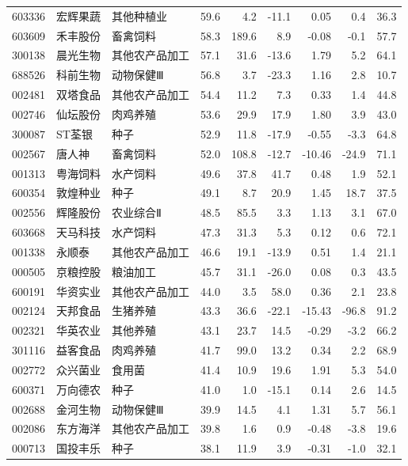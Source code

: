 \begin{longtable}{@{}llp{1.9cm}rrrrrr@{}}
603336 & 宏辉果蔬 & 其他种植业 & 59.6 & 4.2 & -11.1 & 0.05 & 0.4 & 36.3 \\
603609 & 禾丰股份 & 畜禽饲料 & 58.3 & 189.6 & 8.9 & -0.08 & -0.1 & 57.7 \\
300138 & 晨光生物 & 其他农产品加工 & 57.1 & 31.6 & -13.6 & 1.79 & 5.2 & 64.1 \\
688526 & 科前生物 & 动物保健Ⅲ & 56.8 & 3.7 & -23.3 & 1.16 & 2.8 & 10.7 \\
002481 & 双塔食品 & 其他农产品加工 & 54.4 & 11.2 & 7.3 & 0.33 & 1.4 & 44.8 \\
002746 & 仙坛股份 & 肉鸡养殖 & 53.6 & 29.9 & 17.9 & 1.80 & 3.9 & 43.0 \\
300087 & ST荃银 & 种子 & 52.9 & 11.8 & -17.9 & -0.55 & -3.3 & 64.8 \\
002567 & 唐人神 & 畜禽饲料 & 52.0 & 108.8 & -12.7 & -10.46 & -24.9 & 71.1 \\
001313 & 粤海饲料 & 水产饲料 & 49.6 & 37.8 & 41.7 & 0.48 & 1.9 & 52.1 \\
600354 & 敦煌种业 & 种子 & 49.1 & 8.7 & 20.9 & 1.45 & 18.7 & 37.5 \\
002556 & 辉隆股份 & 农业综合Ⅱ & 48.5 & 85.5 & 3.3 & 1.13 & 3.1 & 67.0 \\
603668 & 天马科技 & 水产饲料 & 47.3 & 31.3 & 5.3 & 0.12 & 0.6 & 72.1 \\
001338 & 永顺泰 & 其他农产品加工 & 46.6 & 19.1 & -13.9 & 0.51 & 1.4 & 21.1 \\
000505 & 京粮控股 & 粮油加工 & 45.7 & 31.1 & -26.0 & 0.08 & 0.3 & 43.5 \\
600191 & 华资实业 & 其他农产品加工 & 44.0 & 3.5 & 58.0 & 0.36 & 2.1 & 23.8 \\
002124 & 天邦食品 & 生猪养殖 & 43.3 & 36.6 & -22.1 & -15.43 & -96.8 & 91.2 \\
002321 & 华英农业 & 其他养殖 & 43.1 & 23.7 & 14.5 & -0.29 & -3.2 & 66.2 \\
301116 & 益客食品 & 肉鸡养殖 & 41.7 & 99.0 & 13.2 & 0.34 & 2.2 & 68.9 \\
002772 & 众兴菌业 & 食用菌 & 41.4 & 10.9 & 19.6 & 1.91 & 5.3 & 54.0 \\
600371 & 万向德农 & 种子 & 41.0 & 1.0 & -15.1 & 0.14 & 2.6 & 14.5 \\
002688 & 金河生物 & 动物保健Ⅲ & 39.9 & 14.5 & 4.1 & 1.31 & 5.7 & 56.1 \\
002086 & 东方海洋 & 其他农产品加工 & 39.8 & 1.6 & 0.9 & -0.48 & -3.8 & 19.6 \\
000713 & 国投丰乐 & 种子 & 38.1 & 11.9 & 3.9 & -0.31 & -1.0 & 32.1 \\

\end{longtable}
